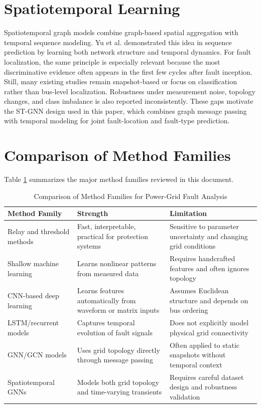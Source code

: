 \documentclass[12pt,a4paper]{article}
\begin{document}
\section{Spatiotemporal Learning}

Spatiotemporal graph models combine graph-based spatial aggregation with temporal sequence modeling. Yu et al. \cite{yu2018} demonstrated this idea in sequence prediction by learning both network structure and temporal dynamics. For fault localization, the same principle is especially relevant because the most discriminative evidence often appears in the first few cycles after fault inception. Still, many existing studies remain snapshot-based or focus on classification rather than bus-level localization. Robustness under measurement noise, topology changes, and class imbalance is also reported inconsistently. These gaps motivate the ST-GNN design used in this paper, which combines graph message passing with temporal modeling for joint fault-location and fault-type prediction.

\section{Comparison of Method Families}

Table \ref{tab:comparison} summarizes the major method families reviewed in this document.

\begin{table}[h]
\centering
\small
\caption{Comparison of Method Families for Power-Grid Fault Analysis}
\label{tab:comparison}
\begin{tabular}{@{}p{}p{}p{}@{}}
\toprule
\textbf{Method Family} & \textbf{Strength} & \textbf{Limitation} \\
\midrule
Relay and threshold methods & Fast, interpretable, practical for protection systems & Sensitive to parameter uncertainty and changing grid conditions \\
Shallow machine learning & Learns nonlinear patterns from measured data & Requires handcrafted features and often ignores topology \\
CNN-based deep learning & Learns features automatically from waveform or matrix inputs & Assumes Euclidean structure and depends on bus ordering \\
LSTM/recurrent models & Captures temporal evolution of fault signals & Does not explicitly model physical grid connectivity \\
GNN/GCN models & Uses grid topology directly through message passing & Often applied to static snapshots without temporal context \\
Spatiotemporal GNNs & Models both grid topology and time-varying transients & Requires careful dataset design and robustness validation \\
\bottomrule
\end{tabular}
\end{table}
\end{document}
